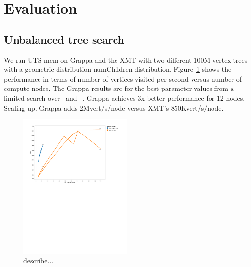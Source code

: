 \section{Evaluation} \label{sec:evaluation}

\subsection{Unbalanced tree search}

We ran UTS-mem on Grappa and the XMT with two different 100M-vertex trees with a geometric distribution numChildren distribution. Figure~\ref{fig:grappa-xmt-uts} shows the performance in terms of number of vertices visited per second versus number of compute nodes. The Grappa results are for the best parameter values from a limited search over \flushtimeout~and \asyncforthr~. Grappa achieves 3x better performance for 12 nodes. Scaling up, Grappa adds 2Mvert/s/node versus XMT's 850Kvert/s/node.



\begin{figure}[h]
    \begin{center}
        \includegraphics[width=0.5\textwidth]{figs/grappa-xmt-uts.pdf}
    \end{center}
    \caption{describe...}
    \label{fig:grappa-xmt-uts}
\end{figure}



